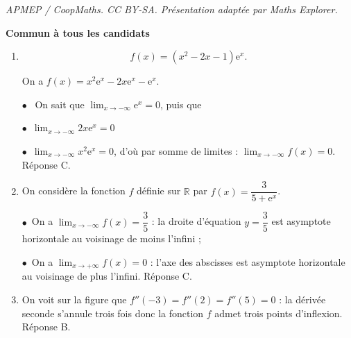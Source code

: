 \documentclass[10pt]{article}
\providecommand{\starredbullet}{\ensuremath{\bullet}}
\providecommand{\R}{\mathbb{R}}
\providecommand{\e}{{\mathrm{e}}}
\begin{document}
\noindent\textit{APMEP / CoopMaths. CC BY-SA. Présentation adaptée par Maths Explorer.}\par\medskip
\textbf{Commun à tous les candidats}

\medskip











\begin{enumerate}
\item 

\[f(x) = \left(x^2 - 2x - 1\right)\e^x.\]






On a $f(x) = x^2\e^x - 2x\e^x - \e^x$.

\starredbullet~ On sait que $\displaystyle\lim_{x \to - \infty} \e^x = 0$, puis que 

\starredbullet~$\displaystyle\lim_{x \to - \infty} 2x\e^x = 0$

\starredbullet~$\displaystyle\lim_{x \to - \infty} x^2\e^x = 0$, d'où par somme de limites : $\displaystyle\lim_{x \to - \infty} f(x) = 0$. Réponse C.
\item  On considère la fonction $f$ définie sur $\R$ par $f(x) = \dfrac{3}{5 + \e^x}$.









\starredbullet~On a $\displaystyle\lim_{x \to - \infty} f(x) = \dfrac{3}{5}$ : la droite d'équation $y = \dfrac{3}{5}$ est asymptote horizontale au voisinage de moins l'infini ;

\starredbullet~On a $\displaystyle\lim_{x \to + \infty} f(x) = 0$ : l'axe des abscisses est asymptote horizontale au voisinage de plus l'infini. Réponse C.
\item  
















On voit sur la figure que $f''(- 3) = f''(2) = f''(5) = 0$ : la dérivée seconde s'annule trois fois donc la fonction $f$ admet trois points d'inflexion. Réponse B.









\end{enumerate}
\end{document}
